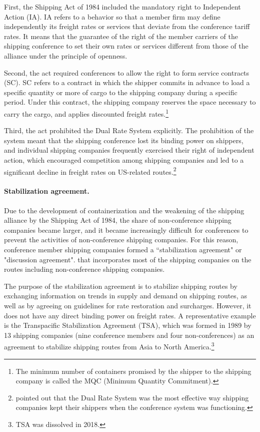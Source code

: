 \documentclass[11pt]{article}
\begin{document}
First, the Shipping Act of 1984 included the mandatory right to Independent Action (IA). IA refers to a behavior so that a member firm may define independently its freight rates or services that deviate from the conference tariff rates. It means that the guarantee of the right of the member carriers of the shipping conference to set their own rates or services different from those of the alliance under the principle of openness.

Second, the act required conferences to allow the right to form service contracts (SC). SC refers to a contract in which the shipper commits in advance to load a specific quantity or more of cargo to the shipping company during a specific period. Under this contract, the shipping company reserves the space necessary to carry the cargo, and applies discounted freight rates.\footnote{The minimum number of containers promised by the shipper to the shipping company is called the MQC (Minimum Quantity Commitment).}

Third, the act prohibited the Dual Rate System explicitly. The prohibition of the system meant that the shipping conference lost its binding power on shippers, and individual shipping companies frequently exercised their right of independent action, which encouraged competition among shipping companies and led to a significant decline in freight rates on US-related routes.\footnote{\cite{JMC2008} pointed out that the Dual Rate System was the most effective way shipping companies kept their shippers when the conference system was functioning.}  

\paragraph{Stabilization agreement.}
Due to the development of containerization and the weakening of the shipping alliance by the Shipping Act of 1984, the share of non-conference shipping companies became larger, and it became increasingly difficult for conferences to prevent the activities of non-conference shipping companies. For this reason, conference member shipping companies formed a ``stabilization agreement" or "discussion agreement". that incorporates most of the shipping companies on the routes including non-conference shipping companies. 

The purpose of the stabilization agreement is to stabilize shipping routes by exchanging information on trends in supply and demand on shipping routes, as well as by agreeing on guidelines for rate restoration and surcharges. However, it does not have any direct binding power on freight rates. A representative example is the Transpacific Stabilization Agreement (TSA), which was formed in 1989 by 13 shipping companies (nine conference members and four non-conferences) as an agreement to stabilize shipping routes from Asia to North America.\footnote{ TSA was dissolved in 2018. } 
\end{document}
